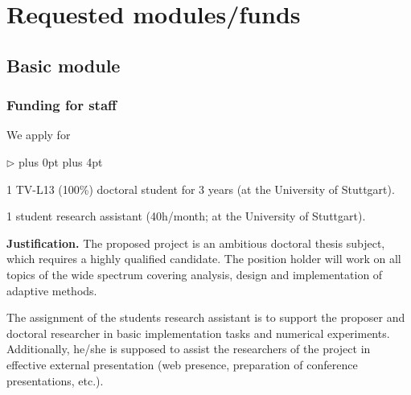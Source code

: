 \documentclass[enabledeprecatedfontcommands,cleardoublepage=empty,headsepline,twoside,11pt,DIV=15,BCOR=12mm,final]{scrartcl}
\renewenvironment{itemize}
{\begin{list}{$\triangleright$}{\labelwidth-2mm \leftmargin3mm %
  \itemsep5pt plus 0pt  \topsep3pt \parsep1pt plus 4pt \labelsep2mm}}
{\end{list}}
\begin{document}
\section{Requested modules/funds}
\label{sec:moduls}

\subsection{Basic module}

\subsubsection{Funding for staff}

We apply for
\begin{itemize}\itemsep=0pt
\item 1 TV-L13 (100\%) doctoral student
  for 3 years (at the University of Stuttgart).
\item 1 student research assistant (40h/month; at the University of Stuttgart).
\end{itemize}
\textbf{Justification.} 
The proposed project is an ambitious doctoral thesis subject, which requires a
highly qualified candidate. The position holder will work on all topics
of the wide spectrum covering analysis, design and implementation of adaptive methods. %

The assignment of the students research assistant is to support the proposer and 
doctoral researcher in basic implementation tasks and numerical experiments. 
Additionally, he/she is supposed to assist the researchers of the project in effective
external presentation (web presence, preparation of conference presentations, etc.).

\end{document}
